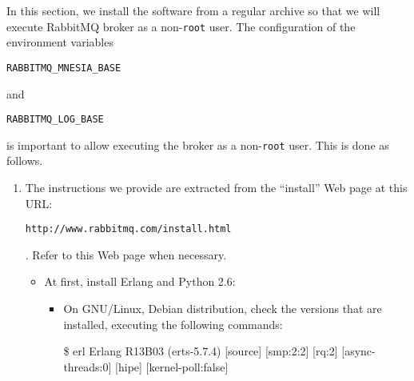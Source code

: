 In this section, we install the software from a regular archive so
that we will execute \textsf{RabbitMQ} broker as a non-\texttt{root}
user. The configuration of the environment
variables \begin{small}\texttt{RABBITMQ\_MNESIA\_BASE}\end{small}
and \begin{small}\texttt{RABBITMQ\_LOG\_BASE}\end{small} is important
to allow executing the broker as a non-\texttt{root} user. This is
done as follows.
\begin{enumerate}
\item The instructions we provide are extracted from the ``install''
  Web page at this
  URL: \begin{small}\texttt{http://www.rabbitmq.com/\-install.html}\end{small}. Refer to this Web page when necessary.
\begin{itemize}
\item At first, install Erlang and Python 2.6:
\begin{itemize}
\item On GNU/Linux, Debian distribution, check the versions that are
  installed, executing the following commands:
\begin{shellcmd}
\$ erl
Erlang R13B03 (erts-5.7.4) [source] [smp:2:2] [rq:2] [async-threads:0] [hipe] [kernel-poll:false]


\end{shellcmd}
\end{itemize}
\end{itemize}
\end{enumerate}
